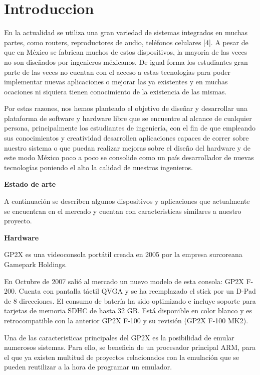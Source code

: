 \chapter{Introduccion}


En la actualidad se utiliza una gran variedad de sistemas integrados en muchas partes, como routers, reproductores de audio, teléfonos celulares [4]. A pesar de que en México se fabrican muchos de estos dispositivos, la mayoria de las veces no son diseñados por ingenieros méxicanos. De igual forma los estudiantes gran parte de las veces no cuentan con el acceso a estas tecnologias para poder implementar nuevas aplicaciones o mejorar las ya existentes y en muchas ocaciones ni siquiera tienen conocimiento de la existencia de las mismas.\medskip

Por estas razones, nos hemos planteado el objetivo de diseñar y desarrollar una plataforma de software y hardware libre que se encuentre al alcance de cualquier persona, principalmente los estudiantes de ingenier\'ia, con el fin de que empleando sus conocimientos y creatividad desarrollen aplicaciones capaces de correr sobre nuestro sistema o que puedan realizar mejoras sobre el diseño del hardware y de este modo México poco a poco se consolide como un pa\'is desarrollador de nuevas tecnologías poniendo el alto la calidad de nuestros ingenieros. \medskip

{\bf Estado de arte}\medskip

A continuación se describen algunos dispositivos y aplicaciones que actualmente se encuentran  en el mercado y cuentan con caracteristicas similares a nuestro proyecto.\medskip

{\bf Hardware}\medskip

GP2X es una videoconsola portátil creada en 2005 por la empresa surcoreana Gamepark Holdings.\medskip

En Octubre de 2007 salió al mercado un nuevo modelo de esta consola: GP2X F-200. Cuenta con pantalla táctil QVGA y se ha reemplazado el stick por un D-Pad de 8 direcciones. El consumo de batería ha sido optimizado e incluye soporte para tarjetas de memoria SDHC de hasta 32 GB. Está disponible en color blanco y es retrocompatible con la anterior GP2X F-100 y su revisión (GP2X F-100 MK2).\medskip

Una de las caracteristicas principales del GP2X es la posibilidad de emular numerosos sistemas. Para ello, se beneficia de un procesador principal ARM, para el que ya existen multitud de proyectos relacionados con la emulación que se pueden reutilizar a la hora de programar un emulador.\medskip

